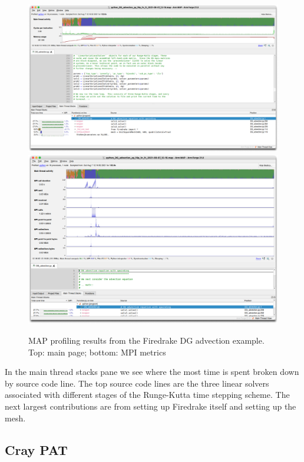 \documentclass[a4paper,titlepage]{article}
\begin{document}
\begin{figure}[htbp]
\begin{center}
\includegraphics[scale=0.3]{figures/DG_advection_MAP_mainPage}
\includegraphics[scale=0.3]{figures/DG_advection_MAP_MPI}
\caption{MAP profiling results from the Firedrake DG advection example. Top: main page; bottom: MPI metrics}
\label{fig:DG_advection_MAP}
\end{center}
\end{figure}
%
In the main thread stacks pane we see where the most time is spent broken down by source code line. The top source code lines are the three linear solvers associated with different stages of the Runge-Kutta time stepping scheme. The next largest contributions are from setting up Firedrake itself and setting up the mesh.


\subsection{Cray PAT}
\end{document}
